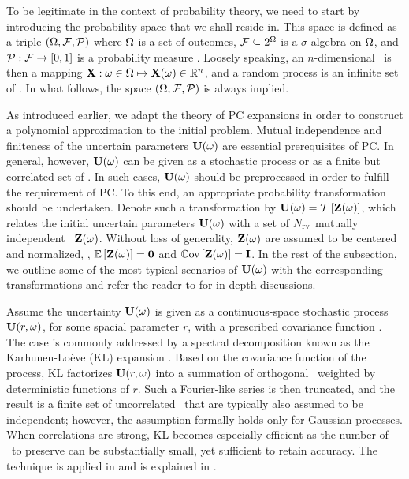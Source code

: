 To be legitimate in the context of probability theory, we need to start by introducing the probability space that we shall reside in. This space is defined as a triple $(\Omega, \mathcal{F}, \mathcal{P})$ where $\Omega$ is a set of outcomes, $\mathcal{F} \subseteq 2^\Omega$ is a $\sigma$-algebra on $\Omega$, and $\mathcal{P}: \mathcal{F} \to [0, 1]$ is a probability measure \cite{durrett2010}. Loosely speaking, an $n$-dimensional \rv\ is then a mapping $\mathbf{X}: \omega \in \Omega \mapsto \mathbf{X}(\omega) \in \mathbb{R}^n$, and a random process is an infinite set of \rvs. In what follows, the space $(\Omega, \mathcal{F}, \mathcal{P})$ is always implied.

As introduced earlier, we adapt the theory of PC expansions in order to construct a polynomial approximation to the initial problem. Mutual independence and finiteness of the uncertain parameters $\mathbf{U}(\omega)$ are essential prerequisites of PC. In general, however, $\mathbf{U}(\omega)$ can be given as a stochastic process or as a finite but correlated set of \rvs. In such cases, $\mathbf{U}(\omega)$ should be preprocessed in order to fulfill the requirement of PC. To this end, an appropriate probability transformation should be undertaken. Denote such a transformation by $\mathbf{U}(\omega) = \mathcal{T}\left[\mathbf{Z}(\omega)\right]$, which relates the initial uncertain parameters $\mathbf{U}(\omega)$ with a set of ${N_\text{rv}}$ mutually independent \rvs\ $\mathbf{Z}(\omega)$. Without loss of generality, $\mathbf{Z}(\omega)$ are assumed to be centered and normalized, \ie, $\oExp{\vZ(\o)} = \mZero$ and $\oCov{\vZ(\o)} = \mI$. In the rest of the subsection, we outline some of the most typical scenarios of $\mathbf{U}(\omega)$ with the corresponding transformations and refer the reader to \cite{xiu2010, eldred2009} for in-depth discussions.

Assume the uncertainty $\mathbf{U}(\omega)$ is given as a continuous-space stochastic process $\mathbf{U}(r, \omega)$, for some spacial parameter $r$, with a prescribed covariance function \cite{durrett2010}. The case is commonly addressed by a spectral decomposition known as the Karhunen-Lo\`{e}ve (KL) expansion \cite{xiu2010, maitre2010, ghanem1991}. Based on the covariance function of the process, KL factorizes $\mathbf{U}(r, \omega)$ into a summation of orthogonal \rvs\ weighted by deterministic functions of $r$. Such a Fourier-like series is then truncated, and the result is a finite set of uncorrelated \rvs\ that are typically also assumed to be independent; however, the assumption formally holds only for Gaussian processes. When correlations are strong, KL becomes especially efficient as the number of \rvs\ to preserve can be substantially small, yet sufficient to retain accuracy. The technique is applied in  and is explained in .

